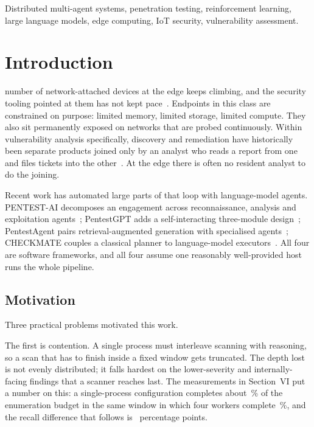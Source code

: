 \documentclass[journal]{IEEEtran}
\begin{document}
\begin{IEEEkeywords}
Distributed multi-agent systems, penetration testing, reinforcement learning,
large language models, edge computing, IoT security, vulnerability assessment.
\end{IEEEkeywords}

\IEEEpeerreviewmaketitle

\section{Introduction}

 number of network-attached devices at the edge keeps
climbing, and the security tooling pointed at them has not kept
pace~\cite{sarhaddi2026}. Endpoints in this class are constrained on purpose:
limited memory, limited storage, limited compute. They also sit permanently
exposed on networks that are probed continuously. Within vulnerability
analysis specifically, discovery and remediation have historically been
separate products joined only by an analyst who reads a report from one and
files tickets into the other~\cite{skandylas2025}. At the edge there is often
no resident analyst to do the joining.

Recent work has automated large parts of that loop with language-model agents.
PENTEST-AI decomposes an engagement across reconnaissance, analysis and
exploitation agents~\cite{bianou2024}; PentestGPT adds a self-interacting
three-module design~\cite{deng2024}; PentestAgent pairs retrieval-augmented
generation with specialised agents~\cite{shen2024}; CHECKMATE couples a
classical planner to language-model executors~\cite{deng2024checkmate}. All
four are software frameworks, and all four assume one reasonably well-provided
host runs the whole pipeline.

\subsection{Motivation}

Three practical problems motivated this work.

The first is contention. A single process must interleave scanning with
reasoning, so a scan that has to finish inside a fixed window gets truncated.
The depth lost is not evenly distributed; it falls hardest on the
lower-severity and internally-facing findings that a scanner reaches last. The
measurements in Section~VI put a number on this: a single-process
configuration completes about \depthA\,\% of the enumeration budget in the
same window in which four workers complete \depthC\,\%, and the recall
difference that follows is \recGain\ percentage points.
\end{document}
